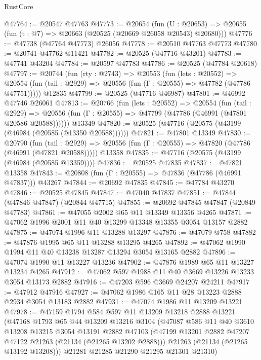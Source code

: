 \begin{lexlean}{RustCore}
\begin{coremodule}
@47764 := @20547 @47763
@47773 := @20654
    (fun (U : @20653) => @20655 (fun (t : @7) => @20663 (@20525 (@20669 @26058 @20543) @20680)))
@47776 := @47738 (@47764 @47773) @26056
@47778 := @20510 @47763 @47773
@47780 := @20741 @47762 @11421
@47782 := @20525 (@47716 @43201)
@47783 := @47741 @43204
@47784 := @20597 @47783
@47786 := @20525 (@47784 @20618)
@47797 := @20744
    (fun (rty : @2743) =>
    @20553
      (fun (lets : @20552) =>
      @20554 (fun (tail : @2929) => @20556 (fun (Γ : @20555) => @47782 (@47786 @47751)))))
    @12835
@47799 := @20525 (@47716 @46987)
@47801 := @46992 @47746 @26061
@47813 := @20766
    (fun (lets : @20552) =>
    @20554
      (fun (tail : @2929) =>
      @20556 (fun (Γ : @20555) => @47799 (@47786 (@46991 (@47801 @20586 @20588))))))
    @13349
@47820 := @20525 (@47716 (@20575 (@43199 (@46984 (@20585 (@13350 @20588))))))
@47821 := @47801 @13349
@47830 := @20790
    (fun (tail : @2929) => @20556 (fun (Γ : @20555) => @47820 (@47786 (@46991 (@47821 @20588)))))
    @13358
@47835 := @47716 (@20575 (@43199 (@46984 (@20585 @13359))))
@47836 := @20525 @47835
@47837 := @47821 @13358
@47843 := @20808 (fun (Γ : @20555) => @47836 (@47786 (@46991 @47837))) @43267
@47844 := @20692 @47835
@47845 := @47784 @43270
@47846 := @20525 @47845
@47847 := @47040 @47837
@47851 := @47844 (@47846 @47847) (@20844 @47715)
@47855 := @20692 @47845 @47847 (@20849 @47783)
@47861 := @47055 @2002 @65 @11 @13349 @13356 @4265
@47871 := @47062 @1996 @2001 @11 @40 @13299 @13348 @13355 @3054 @13157 @2882
@47875 := @47074 @1996 @11 @13288 @13297
@47876 := @47079 @758
@47882 := @47876 @1995 @65 @11 @13288 @13295 @4265
@47892 := @47062 @1990 @1994 @11 @40 @13238 @13287 @13294 @3054 @13165 @2882
@47896 := @47074 @1990 @11 @13227 @13236
@47902 := @47876 @1989 @65 @11 @13227 @13234 @4265
@47912 := @47062 @597 @1988 @11 @40 @3669 @13226 @13233 @3054 @13173 @2882
@47916 := @47203 @596 @3669 @24207 @24211
@47917 := @47912 @47916
@47927 := @47062 @1986 @165 @11 @28 @13223 @2888 @2934 @3054 @13183 @2882
@47931 := @47074 @1986 @11 @13209 @13221
@47978 := @47159
    @1794
    @584
    @597
    @11
    @13209
    @13218
    @2888
    @13221
    (@47168
      @1793
      @65
      @44
      @13209
      @13216
      @3104
      (@47087
        @586
        @11
        @40
        @3610
        @13208
        @13215
        @3054
        @13191
        @2882
        @47103
        (@47199 @13201 @2882 @47207 @47122 @21263 (@21134 (@21265 @13202 @2888)))
        @21263
        (@21134 (@21265 @13192 @13208)))
      @21281
      @21285
      @21290
      @21295
      @21301
      @21310)

\end{coremodule}
\end{lexlean}
